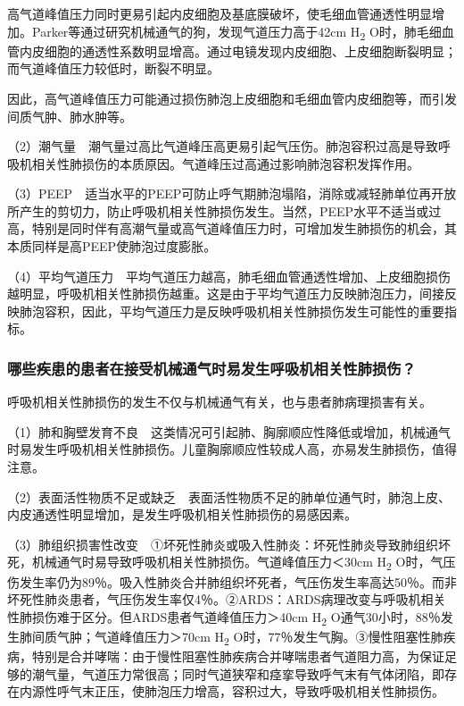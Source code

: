 高气道峰值压力同时更易引起内皮细胞及基底膜破坏，使毛细血管通透性明显增加。Parker等通过研究机械通气的狗，发现气道压力高于42cm
H\textsubscript{2}
O时，肺毛细血管内皮细胞的通透性系数明显增高。通过电镜发现内皮细胞、上皮细胞断裂明显；而气道峰值压力较低时，断裂不明显。

因此，高气道峰值压力可能通过损伤肺泡上皮细胞和毛细血管内皮细胞等，而引发间质气肿、肺水肿等。

（2）潮气量　潮气量过高比气道峰压高更易引起气压伤。肺泡容积过高是导致呼吸机相关性肺损伤的本质原因。气道峰压过高通过影响肺泡容积发挥作用。

（3）PEEP　适当水平的PEEP可防止呼气期肺泡塌陷，消除或减轻肺单位再开放所产生的剪切力，防止呼吸机相关性肺损伤发生。当然，PEEP水平不适当或过高，特别是同时伴有高潮气量或高气道峰值压力时，可增加发生肺损伤的机会，其本质同样是高PEEP使肺泡过度膨胀。

（4）平均气道压力　平均气道压力越高，肺毛细血管通透性增加、上皮细胞损伤越明显，呼吸机相关性肺损伤越重。这是由于平均气道压力反映肺泡压力，间接反映肺泡容积，因此，平均气道压力是反映呼吸机相关性肺损伤发生可能性的重要指标。

\subsubsection{哪些疾患的患者在接受机械通气时易发生呼吸机相关性肺损伤？}

呼吸机相关性肺损伤的发生不仅与机械通气有关，也与患者肺病理损害有关。

（1）肺和胸壁发育不良　这类情况可引起肺、胸廓顺应性降低或增加，机械通气时易发生呼吸机相关性肺损伤。儿童胸廓顺应性较成人高，亦易发生肺损伤，值得注意。

（2）表面活性物质不足或缺乏　表面活性物质不足的肺单位通气时，肺泡上皮、内皮通透性明显增加，是发生呼吸机相关性肺损伤的易感因素。

（3）肺组织损害性改变　①坏死性肺炎或吸入性肺炎：坏死性肺炎导致肺组织坏死，机械通气时易导致呼吸机相关性肺损伤。气道峰值压力＜30cm
H\textsubscript{2}
O时，气压伤发生率仍为89％。吸入性肺炎合并肺组织坏死者，气压伤发生率高达50％。而非坏死性肺炎患者，气压伤发生率仅4％。②ARDS：ARDS病理改变与呼吸机相关性肺损伤难于区分。但ARDS患者气道峰值压力＞40cm
H\textsubscript{2} O通气30小时，88％发生肺间质气肿；气道峰值压力＞70cm
H\textsubscript{2}
O时，77％发生气胸。③慢性阻塞性肺疾病，特别是合并哮喘：由于慢性阻塞性肺疾病合并哮喘患者气道阻力高，为保证足够的潮气量，气道压力常很高；同时气道狭窄和痉挛导致呼气末有气体闭陷，即存在内源性呼气末正压，使肺泡压力增高，容积过大，导致呼吸机相关性肺损伤。

